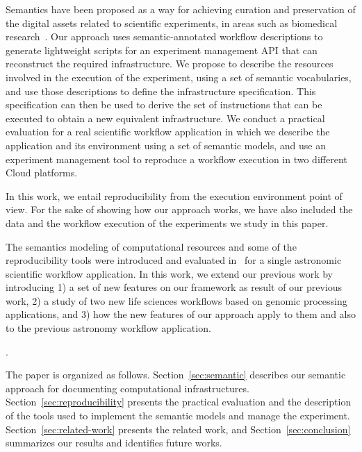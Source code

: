 Semantics have been proposed as a way for achieving curation and preservation of the digital assets related to scientific experiments, in areas such as biomedical research~\cite{MaloneSWO2014}. Our approach uses semantic-annotated workflow descriptions to generate lightweight scripts for an experiment management API that can reconstruct the required infrastructure. We propose to describe the resources involved in the execution of the experiment, using a set of semantic vocabularies, and use those descriptions to define the infrastructure specification. This specification can then be used to derive the set of instructions that can be executed to obtain a new equivalent infrastructure. We conduct a practical evaluation for a real scientific workflow application in which we describe the application and its environment using a set of semantic models, and use an experiment management tool to reproduce a workflow execution in two different Cloud platforms. 

In this work, we entail reproducibility from the execution environment point of view. For  the sake of showing how our approach works, we have also included the data and the workflow execution of the experiments we study in this paper.

The semantics modeling of computational resources and some of the reproducibility tools 
were introduced and evaluated in~\cite{SantanaPerez-REPPAR-2014} for a single astronomic scientific 
workflow application. In this work, we extend our previous work by introducing 1) a set of new features on our
framework as result of our previous work, 2) a study of two new life sciences workflows based on genomic processing applications,
 and 3) how the new features of our approach apply to them and also to the previous astronomy workflow application. 

 .

The paper is organized as follows. Section~\ref{sec:semantic} describes our semantic approach for documenting computational infrastructures. Section~\ref{sec:reproducibility} presents the practical evaluation and the description of the tools used to implement the semantic models and manage the experiment. Section~\ref{sec:related-work} presents the related work, and Section~\ref{sec:conclusion} summarizes our results and identifies future works.
